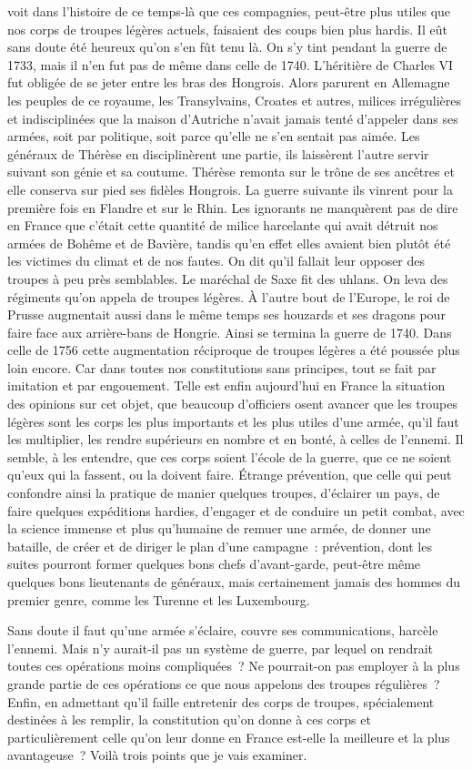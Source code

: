 \documentclass[french,twoside]{book} %
\begin{document}
voit dans l’histoire de ce temps-là que ces compagnies, peut-être plus utiles que nos corps de troupes légères actuels, faisaient des coups bien plus hardis. Il eût sans doute été heureux qu’on s’en fût tenu là. On s’y tint pendant la guerre de 1733, mais il n’en fut pas de même dans celle de 1740. L’héritière de Charles VI fut obligée de se jeter entre les bras des Hongrois. Alors parurent en Allemagne les peuples de ce royaume, les Transylvains, Croates et autres, milices irrégulières et indisciplinées que la maison d’Autriche n’avait jamais tenté d’appeler dans ses armées, soit par politique, soit parce qu’elle ne s’en sentait pas aimée. Les généraux de Thérèse en disciplinèrent une partie, ils laissèrent l’autre servir suivant son génie et sa coutume. Thérèse remonta sur le trône de ses ancêtres et elle conserva sur pied ses fidèles Hongrois. La guerre suivante ils vinrent pour la première fois en Flandre et sur le Rhin. Les ignorants ne manquèrent pas de dire en France que c’était cette quantité de milice harcelante qui avait détruit nos armées de Bohême et de Bavière, tandis qu’en effet elles avaient bien plutôt été les victimes du climat et de nos fautes. On dit qu’il fallait leur opposer des troupes à peu près semblables. Le maréchal de Saxe fit des uhlans. On leva des régiments qu’on appela de troupes légères. À l’autre bout de l’Europe, le roi de Prusse augmentait aussi dans le même temps ses houzards et ses dragons pour faire face aux arrière-bans de Hongrie. Ainsi se termina la guerre de 1740. Dans celle de 1756 cette augmentation réciproque de troupes légères a été poussée plus loin encore. Car dans toutes nos constitutions sans principes, tout se fait par imitation et par engouement. Telle est enfin aujourd’hui en France la situation des opinions sur cet objet, que beaucoup d’officiers osent avancer que les troupes légères sont les corps les plus importants et les plus utiles d’une armée, qu’il faut les multiplier, les rendre supérieurs en nombre et en bonté, à celles de l’ennemi. Il semble, à les entendre, que ces corps soient l’école de la guerre, que ce ne soient qu’eux qui la fassent, ou la doivent faire. Étrange prévention, que celle qui peut confondre ainsi la pratique de manier quelques troupes, d’éclairer un pays, de faire quelques expéditions hardies, d’engager et de conduire un petit combat, avec la science immense et plus qu’humaine de remuer une armée, de donner une bataille, de créer et de diriger le plan d’une campagne : prévention, dont les suites pourront former quelques bons chefs d’avant-garde, peut-être même quelques bons lieutenants de généraux, mais certainement jamais des hommes du premier genre, comme les Turenne et les Luxembourg.\par
Sans doute il faut qu’une armée s’éclaire, couvre ses communications, harcèle l’ennemi. Mais n’y aurait-il pas un système de guerre, par lequel on rendrait toutes ces opérations moins compliquées ? Ne pourrait-on pas employer à la plus grande partie de ces opérations ce que nous appelons des troupes régulières ? Enfin, en admettant qu’il faille entretenir des corps de troupes, spécialement destinées à les remplir, la constitution qu’on donne à ces corps et particulièrement celle qu’on leur donne en France est-elle la meilleure et la plus avantageuse ? Voilà trois points que je vais examiner.
\end{document}
